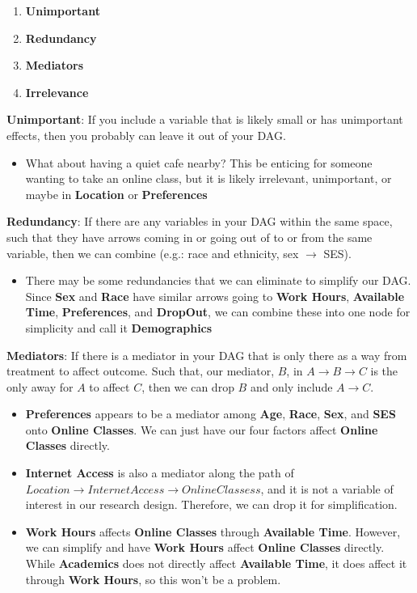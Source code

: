 \documentclass[
]{book}
\providecommand{\tightlist}{%
  \setlength{\itemsep}{0pt}\setlength{\parskip}{0pt}}
\begin{document}
\begin{enumerate}
\def\labelenumi{\arabic{enumi}.}
\tightlist
\item
  \textbf{Unimportant}
\item
  \textbf{Redundancy}
\item
  \textbf{Mediators}
\item
  \textbf{Irrelevance}
\end{enumerate}

\textbf{Unimportant}: If you include a variable that is likely small or has unimportant effects, then you probably can leave it out of your DAG.

\begin{itemize}
\tightlist
\item
  What about having a quiet cafe nearby? This be enticing for someone wanting to take an online class, but it is likely irrelevant, unimportant, or maybe in \textbf{Location} or \textbf{Preferences}
\end{itemize}

\textbf{Redundancy}: If there are any variables in your DAG within the same space, such that they have arrows coming in or going out of to or from the same variable, then we can combine (e.g.: race and ethnicity, sex \(\rightarrow\) SES).

\begin{itemize}
\tightlist
\item
  There may be some redundancies that we can eliminate to simplify our DAG. Since \textbf{Sex} and \textbf{Race} have similar arrows going to \textbf{Work Hours}, \textbf{Available Time}, \textbf{Preferences}, and \textbf{DropOut}, we can combine these into one node for simplicity and call it \textbf{Demographics}
\end{itemize}

\textbf{Mediators}: If there is a mediator in your DAG that is only there as a way from treatment to affect outcome. Such that, our mediator, \(B\), in \(A \rightarrow B \rightarrow C\) is the only away for \(A\) to affect \(C\), then we can drop \(B\) and only include \(A \rightarrow C\).

\begin{itemize}
\item
  \textbf{Preferences} appears to be a mediator among \textbf{Age}, \textbf{Race}, \textbf{Sex}, and \textbf{SES} onto \textbf{Online Classes}. We can just have our four factors affect \textbf{Online Classes} directly.
\item
  \textbf{Internet Access} is also a mediator along the path of \(Location \rightarrow InternetAccess \rightarrow OnlineClassess\), and it is not a variable of interest in our research design. Therefore, we can drop it for simplification.
\item
  \textbf{Work Hours} affects \textbf{Online Classes} through \textbf{Available Time}. However, we can simplify and have \textbf{Work Hours} affect \textbf{Online Classes} directly. While \textbf{Academics} does not directly affect \textbf{Available Time}, it does affect it through \textbf{Work Hours}, so this won't be a problem.
\end{itemize}
\end{document}
